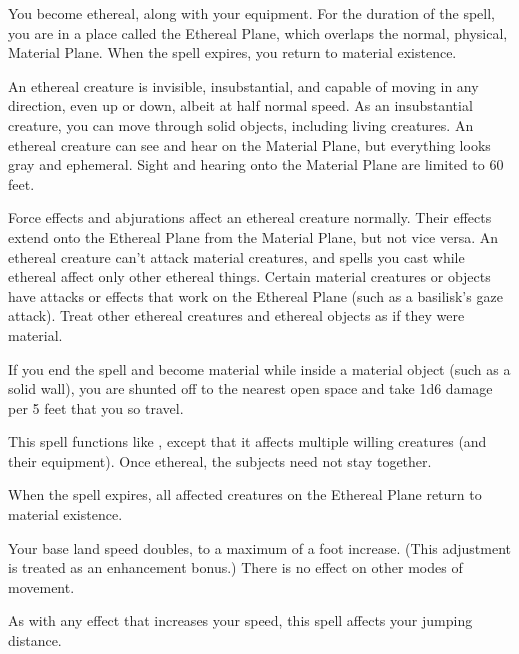 \spellrng{\rngpers}
\begin{spelleffect}
  You become ethereal, along with your equipment. For the duration of the spell, you are in a place called the Ethereal Plane, which overlaps the normal, physical, Material Plane. When the spell expires, you return to material existence.
  \par An ethereal creature is invisible, insubstantial, and capable of moving in any direction, even up or down, albeit at half normal speed. As an insubstantial creature, you can move through solid objects, including living creatures. An ethereal creature can see and hear on the Material Plane, but everything looks gray and ephemeral. Sight and hearing onto the Material Plane are limited to 60 feet.
  \par Force effects and abjurations affect an ethereal creature normally. Their effects extend onto the Ethereal Plane from the Material Plane, but not vice versa. An ethereal creature can't attack material creatures, and spells you cast while ethereal affect only other ethereal things. Certain material creatures or objects have attacks or effects that work on the Ethereal Plane (such as a basilisk's gaze attack). Treat other ethereal creatures and ethereal objects as if they were material. 
  \par If you end the spell and become material while inside a material object (such as a solid wall), you are shunted off to the nearest open space and take 1d6 damage per 5 feet that you so travel.
\end{spelleffect}

\begin{spelleffect}
  This spell functions like , except that it affects multiple willing creatures (and their equipment). Once ethereal, the subjects need not stay together.
\end{spelleffect}
\begin{spellnotes}
  When the spell expires, all affected creatures on the Ethereal Plane return to material existence.
\end{spellnotes}

\spellrng{\rngclose}
\begin{spelleffect}
  Your base land speed doubles, to a maximum of a  foot increase. (This adjustment is treated as an enhancement bonus.) There is no effect on other modes of movement.
\end{spelleffect}
\begin{spellnotes}
 As with any effect that increases your speed, this spell affects your jumping distance.
 \end{spellnotes}

